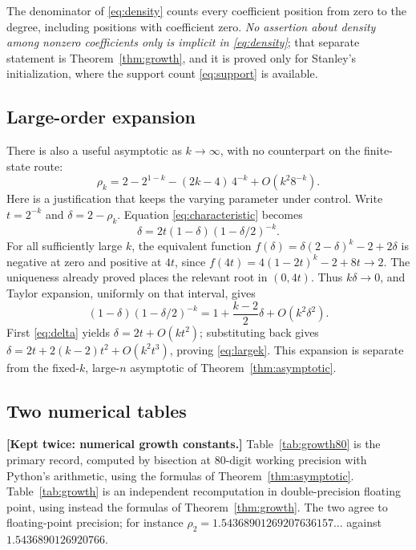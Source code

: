 \documentclass[11pt,letterpaper]{article}
\numberwithin{equation}{section}
\theoremstyle{definition}
\theoremstyle{remark}
\newcommand{\code}[1]{\texttt{\detokenize{#1}}}
\begin{document}
The denominator of \eqref{eq:density} counts every coefficient position
from zero to the degree, including positions with coefficient zero.
\emph{No assertion about density among nonzero coefficients only is implicit
in \eqref{eq:density}}; that separate statement is
Theorem~\ref{thm:growth}, and it is proved only for Stanley's
initialization, where the support count \eqref{eq:support} is available.

\subsection{Large-order expansion}
\label{sec:largek}

There is also a useful asymptotic as $k\to\infty$, with no counterpart on
the finite-state route:
\begin{equation}
 \rho_k=2-2^{1-k}-(2k-4)\,4^{-k}+O(k^2 8^{-k}).
 \label{eq:largek}
\end{equation}
Here is a justification that keeps the varying parameter under control.
Write $t=2^{-k}$ and $\delta=2-\rho_k$. Equation \eqref{eq:characteristic}
becomes
\begin{equation}
 \delta=2t(1-\delta)(1-\delta/2)^{-k}.
 \label{eq:delta}
\end{equation}
For all sufficiently large $k$, the equivalent function
$f(\delta)=\delta(2-\delta)^k-2+2\delta$ is negative at zero and positive
at $4t$, since $f(4t)=4(1-2t)^k-2+8t\to2$. The uniqueness already proved
places the relevant root in $(0,4t)$. Thus $k\delta\to0$, and Taylor
expansion, uniformly on that interval, gives
\[
 (1-\delta)(1-\delta/2)^{-k}=1+\frac{k-2}{2}\delta+O(k^2\delta^2).
\]
First \eqref{eq:delta} yields $\delta=2t+O(kt^2)$; substituting back gives
$\delta=2t+2(k-2)t^2+O(k^2t^3)$, proving \eqref{eq:largek}. This expansion
is separate from the fixed-$k$, large-$n$ asymptotic of
Theorem~\ref{thm:asymptotic}.

\subsection{Two numerical tables}
\label{sec:growthtables}

\noindent\textbf{[Kept twice: numerical growth constants.]}
Table~\ref{tab:growth80} is the primary record, computed by bisection at
$80$-digit working precision with Python's \code{Decimal} arithmetic, using
the formulas of Theorem~\ref{thm:asymptotic}. Table~\ref{tab:growth} is an
independent recomputation in double-precision floating point, using instead
the formulas of Theorem~\ref{thm:growth}. The two agree to floating-point
precision; for instance $\rho_2=1.54368901269207636157\ldots$ against
$1.5436890126920766$.
\end{document}
